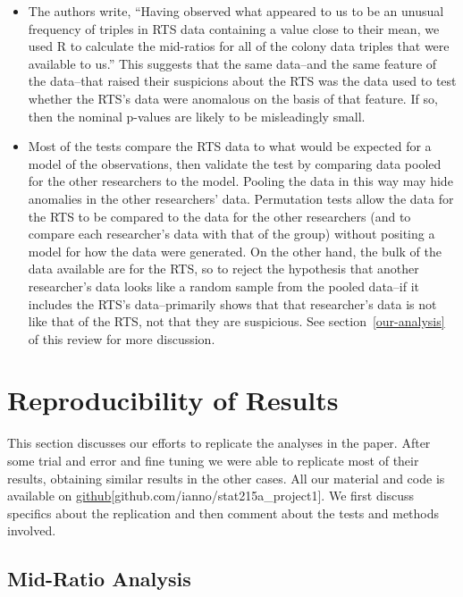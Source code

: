 \documentclass{article}
\begin{document}
\begin{itemize}
\item
  The authors write, “Having observed what appeared to us to be an unusual frequency of triples in RTS data containing a value close to their mean, we used R to calculate the mid-ratios for all of the colony data triples that were available to us.” This suggests that the same data--and the same feature of the data--that raised their suspicions about the RTS was the data used to test whether the RTS's data were anomalous on the basis of that feature. If so, then the nominal p-values are likely to be misleadingly small.
\item
  Most of the tests compare the RTS data to what would be expected for a model of the observations, then validate the test by comparing data pooled for the other researchers to the model. Pooling the data in this way may hide anomalies in the other researchers' data. Permutation tests allow the data for the RTS to be compared to the data for the other researchers (and to compare each researcher's data with that of the group) without positing a model for how the data were generated. On the other hand, the bulk of the data available are for the RTS, so to reject the hypothesis that another researcher's data looks like a random sample from the pooled data--if it includes the RTS's data--primarily shows that that researcher's data is not like that of the RTS, not that they are suspicious. See section~\ref{our-analysis} of this review for more discussion.
\end{itemize}

    \section{Reproducibility of Results}\label{reproducibility-of-results}

This section discusses our efforts to replicate the analyses in the paper. 
After some trial and error and fine tuning we were able to replicate most of
their results, obtaining similar results in the other cases. All our
material and code is available on \hyperlink{https://github.com/ianno/stat215a_project1}{github}[github.com/ianno/stat215a\_project1]. We first discuss specifics about the replication and then comment about the tests and methods involved.


    \subsection{Mid-Ratio Analysis}\label{mid-ratio-analysis}
\end{document}
